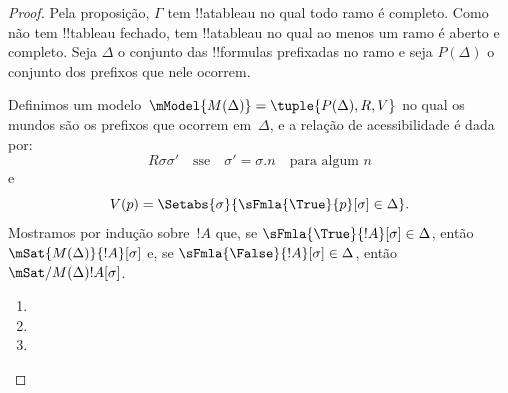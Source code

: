 \documentclass[../../../include/open-logic-section]{subfiles}
\begin{document}
\begin{proof}
Pela proposição, $\Gamma$ tem !!a{tableau} no qual todo ramo é completo.
Como não tem !!{tableau} fechado, tem !!a{tableau} no qual ao menos um
ramo é aberto e completo. Seja $\Delta$ o conjunto das !!{formula}s
prefixadas no ramo e seja $P(\Delta)$ o conjunto dos prefixos que nele
ocorrem.

Definimos um modelo~$\mModel{M(\Delta)} = \tuple{P(\Delta), R, V}$ no
qual os mundos são os prefixos que ocorrem em~$\Delta$, e a relação de
acessibilidade é dada por:
\[
R\sigma\sigma' \quad \text{sse} \quad
\sigma'=\sigma.n \quad \text{para algum~$n$}
\]
e
\[
V(p) = \Setabs{\sigma}{\sFmla{\True}{p}[\sigma] \in \Delta}.
\]
Mostramos por indução sobre~$!A$ que, se
$\sFmla{\True}{!A}[\sigma] \in \Delta$, então
$\mSat{M(\Delta)}{!A}[\sigma]$ e, se
$\sFmla{\False}{!A}[\sigma] \in \Delta$, então
$\mSat/{M(\Delta)}{!A}[\sigma]$.

\begin{enumerate}
  \item {}
  \item {}
  \item {}
\end{enumerate}
\end{proof}
\end{document}
